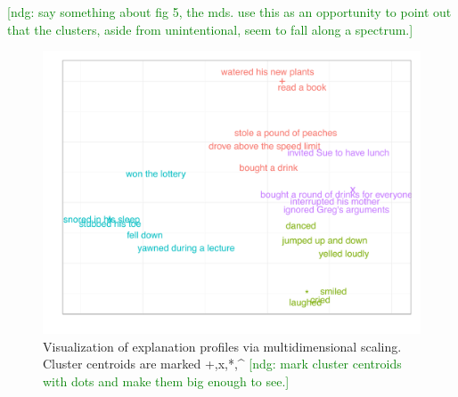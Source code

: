 \documentclass[10pt,letterpaper]{article}
\newcommand{\red}[1]{\textcolor{Red}{#1}}
\newcommand{\ndg}[1]{\textcolor{Green}{[ndg: #1]}}
\begin{document}
\ndg{say something about fig 5, the mds. use this as an opportunity to point out that the clusters, aside from unintentional, seem to fall along a spectrum.}







\begin{figure}[htb!]
\begin{center}\includegraphics[width=1\columnwidth]{images/study2MDS.pdf}\end{center}
\caption{ Visualization of explanation profiles via multidimensional scaling. Cluster centroids are marked +,x,*,\^{}  \ndg{mark cluster centroids with dots and make them big enough to see.}}
\label{Study2MDSFig}
\end{figure}
\end{document}
